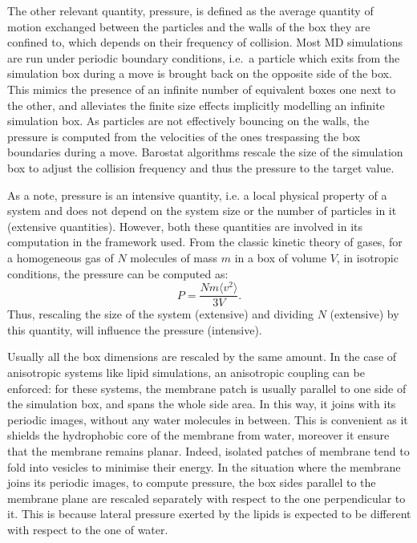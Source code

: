 The other relevant quantity, pressure, is defined as the average quantity of motion exchanged between the particles and the walls of the box they are confined to, which depends on their frequency of collision. Most MD simulations are run under periodic boundary conditions, i.e.\ a particle which exits from the simulation box during a move is brought back on the opposite side of the box. This mimics the presence of an infinite number of equivalent boxes one next to the other, and alleviates the finite size effects implicitly modelling an infinite simulation box.
%
As particles are not effectively bouncing on the walls, the pressure is computed from the velocities of the ones trespassing the box boundaries during a move.
%
Barostat algorithms rescale the size of the simulation box to adjust the collision frequency and thus the pressure to the target value.

As a note, pressure is an intensive quantity, i.e. a local physical property of a system and does not depend on the system size or the number of particles in it (extensive quantities). However, both these quantities are involved in its computation in the framework used. From the classic kinetic theory of gases, for a homogeneous gas of $N$ molecules of mass $m$ in a box of volume $V$, in isotropic conditions, the pressure can be computed as:
\begin{equation}
P = \frac{Nm\langle v^2\rangle}{3V}.
\end{equation}
Thus, rescaling the size of the system (extensive) and dividing $N$ (extensive) by this quantity, will influence the pressure (intensive).

Usually all the box dimensions are rescaled by the same amount. In the case of anisotropic systems like lipid simulations, an anisotropic coupling can be enforced: for these systems, the membrane patch is usually parallel to one side of the simulation box, and spans the whole side area. In this way, it joins with its periodic images, without any water molecules in between. This is convenient as it shields the hydrophobic core of the membrane from water, moreover it ensure that the membrane remains planar. Indeed, isolated patches of membrane tend to fold into vesicles to minimise their energy.
%
In the situation where the membrane joins its periodic images, to compute pressure, the box sides parallel to the membrane plane are rescaled separately with respect to the one perpendicular to it.
This is because lateral pressure exerted by the lipids is expected to be different with respect to the one of water.


